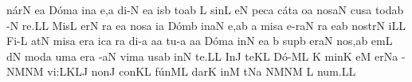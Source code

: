 \sgn n{\'a}r\punctum N\egn
\sgn {}e{}\punctum a\egn
\spatium
\sgn D{\'o}m\punctum a\egn
\sgn {}in\punctum a\egn
\sgn {}e,\punctum a\egn
\spatium
\sgn di-\punctum N\egn
\sgn {}e{}\punctum a\egn
\spatium
\sgn {}is\punctum b\egn
\sgn to{}\punctum a\augmentum b\egn
\spatium
\divisiominor
\spatium
\custos L
\lineaproxima
\sgn sin\punctum L\egn
\sgn {}e{}\punctum N\egn
\spatium
\sgn pec\punctum a\egn
\sgn c{\'a}t\punctum a\egn
\sgn {}o{}\punctum a\egn
\spatium
\sgn nos\clivis aN\egn
\spatium
\sgn cus\punctum a\egn
\sgn tod\pes ab\egn
\sgn {}{\'\i}-\bivirga N\egn
\sgn re.\punctum L\augmentum L\egn
\spatium
\divisiofinalis
\spatium
\sgn Mis\punctum L\egn
\sgn {}er\punctum N\egn
{}r\punctum a\egn
\sgn {}e{}\punctum a\egn
\spatium
\sgn nos\punctum a\egn
{}i{}\punctum a\egn
\spatium
\sgn D{\'o}m\punctum b\egn
\sgn {}in\clivis aN\egn
\sgn {}e,\punctum a\augmentum b\egn
\spatium
\divisiominor
\spatium
\custos a
\lineaproxima
\sgn mis\punctum a\egn
\sgn {}e{-r}\clivis aN\egn
{}r\punctum a\egn
\sgn {}e{}\pes ab\egn
\spatium
\sgn no{str}\bivirga N\egn
\sgn {}i{}\punctum L\augmentum L\egn
\spatium
\divisiofinalis
\spatium
\sgn Fi-\punctum L\egn
\sgn {}at\punctum N\egn
\spatium
\sgn mis\punctum a\egn
\sgn {}er\punctum a\egn
\sgn {}ic\punctum a\egn
{}r\punctum a\egn
\sgn di-\punctum a\egn
\sgn {}a{}\punctum a\egn
\spatium
\sgn tu-\punctum a\egn
\sgn {}a{}\punctum a\egn
\spatium
\sgn D{\'o}m\punctum a\egn
\sgn {}in\punctum N\egn
\sgn {}e{}\punctum a\egn
\spatium
\custos b
\lineaproxima
\sgn sup\punctum b\egn
\sgn {}er\clivis aN\egn
\spatium
\sgn no{s,}\punctum a\augmentum b\egn
\spatium
\divisiominor
\spatium
{}em\punctum L\egn
{}d\punctum N\egn
\sgn mod\punctum a\egn
\sgn {}um\punctum a\egn
\spatium
{}er\punctum a\egn
{}-\clivis aN\egn
\sgn vim\punctum a\egn
\sgn {}us\pes ab\egn
\spatium
\sgn {}in\bivirga N\egn
\spatium
\sgn te.\punctum L\augmentum L\egn
\spatium
\divisiofinalis
\spatium
\sgn {}In\punctum J\egn
\spatium
\sgn te{}\pes KL\egn
\spatium
\sgn D{\'o}-\clivis ML\egn
\custos K
\lineaproxima
\sgn min\punctum K\egn
\sgn {}e{}\punctum M\egn
\spatium
{}er\pes Na\egn
{}-\clivis NM\clivis NM\egn
\sgn vi:\clivis LK\augmentumduplex LJ\egn
\spatium
\divisiominor
\spatium
\sgn non\punctum J\egn
\spatium
\sgn con\pes KL\egn
\sgn f{\'u}n\clivis ML\egn
\sgn dar\punctum K\egn
\spatium
\sgn {}in\punctum M\egn
\spatium
\sgn {}{\ae}t\pes Na\egn
{}\clivis NM\virga N\spatiumparvum\punctuminclinatumparvum M%
\nonspatium\punctuminclinatumparvum L\egn
\sgn nu{m.}\punctum L\augmentum L\egn
\spatium
\Finisgregoriana

